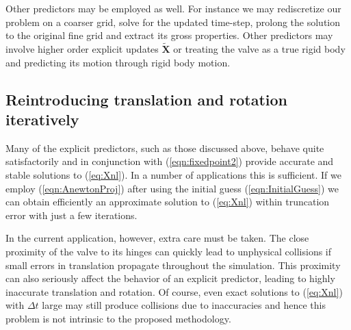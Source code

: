 \documentclass[preprint,12pt]{elsarticle}
\begin{document}
Other predictors may be employed as well. 
For instance we may rediscretize our problem on a coarser grid, solve for the updated time-step, prolong the solution to the original fine grid and extract its gross properties. 
Other predictors may involve higher order explicit updates $\tilde{\mathbf{X}}$ or treating the valve as a true rigid body and predicting its motion through rigid body motion. 

\subsection{Reintroducing translation and rotation iteratively}
Many of the explicit predictors, such as those discussed above,  behave quite satisfactorily and in conjunction with  (\ref{eqn:fixedpoint2}) provide accurate and stable solutions to (\ref{eq:Xnl}). 
 In a number of applications this is sufficient. If we employ (\ref{eqn:AnewtonProj}) after using the initial guess (\ref{eqn:InitialGuess}) we can obtain efficiently an approximate  solution to (\ref{eq:Xnl}) within truncation error with just a few iterations.

In the current application, however, extra care must be taken. The close proximity of the valve to its hinges can quickly lead to unphysical collisions  if small errors in translation propagate throughout the simulation. 
This proximity can also seriously affect the behavior of an explicit predictor, leading to highly inaccurate translation and rotation.
Of course, even exact solutions to (\ref{eq:Xnl}) with $\Delta t$ large may still produce collisions due to inaccuracies and hence
this problem is not intrinsic to the proposed methodology. 
\end{document}
